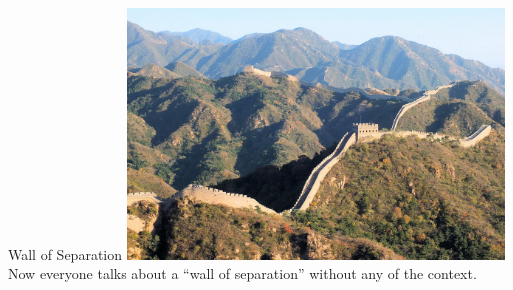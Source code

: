 
\begin{frame}{Wall of Separation}
    \centering
    \includegraphics[width=0.75\textwidth]{img/great-wall.jpg} \\
    Now everyone talks about a ``wall of separation'' without any of the context.
\end{frame}

